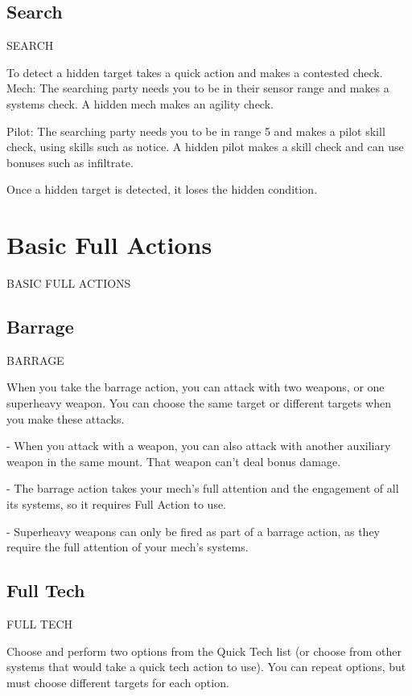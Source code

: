 \subsection{Search}
                                                   SEARCH  

To detect a hidden target takes a quick action and makes a contested check.  
         Mech: The searching party needs you to be in their sensor range and makes a systems  
         check. A hidden mech makes an agility check.
 
         Pilot: The searching party needs you to be in range 5 and makes a pilot skill check, using  
         skills such as notice. A hidden pilot makes a skill check and can use bonuses such as  
         infiltrate.
 
Once a hidden target is detected, it loses the hidden condition.

\section{Basic Full Actions}BASIC FULL ACTIONS  
\subsection{Barrage}
                                               BARRAGE  

When you take the barrage action, you can attack with two weapons, or one superheavy  
weapon. You can choose the same target or different targets when you make these attacks.
 
        	- When you attack with a weapon, you can also attack with another auxiliary weapon in  
        the same mount. That weapon can’t deal bonus damage.
 
        	- The barrage action takes your mech’s full attention and the engagement of all its  
        systems, so it requires Full Action to use. 
 
        	- Superheavy weapons can only be fired as part of a barrage action, as they require the  
        full attention of your mech’s systems.  
\subsection{Full Tech}
                                              FULL TECH  

Choose and perform two options from the Quick Tech list (or choose from other systems that  
would take a quick tech action to use). You can repeat options, but must choose different targets  
for each option.
 


